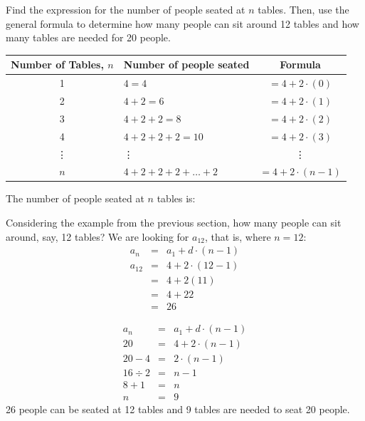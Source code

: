 {\begin{mdframed}[linewidth=4, leftmargin=40, rightmargin=40]
\begin{exercise}
{\begin{figure}[H]
\begin{center}
\end{center}
\end{figure}
Find the expression for the number of people seated at $n$ tables. Then, use the general formula to determine how many people can sit around 12 tables and how many tables are needed for 20 people.}{
\begin{center}
\begin{tabular}{|c|l|c|}\hline
\hline \textbf{Number of Tables}, $n$ & \textbf{Number of people seated} & \textbf{Formula}\\\hline
\hline 1 & $4 = 4$ & $= 4 + 2 \cdot(0)$ \\
\hline 2 & $4 + 2 = 6$ & $= 4 + 2 \cdot(1)$ \\
\hline 3 & $4 + 2 + 2 = 8$ & $= 4 + 2 \cdot(2)$ \\
\hline 4 & $4 + 2 + 2 + 2 = 10$ & $= 4 + 2\cdot(3)$ \\
\hline \vdots & \qquad \qquad \quad \vdots & \vdots \\
\hline $n$ & $4 + 2 + 2 + 2 + \ldots + 2 $ & \: \: \: $= 4 + 2\cdot (n-1)$\\
\hline\hline
\end{tabular}
\end{center}

The number of people seated at $n$ tables is:

Considering the example from the previous section, how many people can sit around, say, 12 tables? We are looking for $a_{12}$, that is, where $n = 12$:
\begin{eqnarray*}
a_n &=& a_1 + d \cdot (n - 1) \\
a_{12} &=& 4 + 2 \cdot (12 - 1) \\
&=& 4 + 2(11) \\
&=& 4 + 22 \\
&=& 26
\end{eqnarray*}

\begin{eqnarray*}
a_n &=& a_1 + d \cdot (n - 1) \\
20 &=& 4 + 2 \cdot (n - 1) \\
20 - 4 &=& 2 \cdot (n - 1) \\
16 \div 2 &=& n - 1 \\
8 + 1 &=& n \\
n &=& 9
\end{eqnarray*}
26 people can be seated at 12 tables and 9 tables are needed to seat 20 people.}%


    \end{exercise}
    \end{mdframed}
    }
